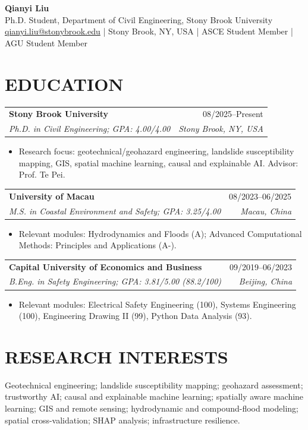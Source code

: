 \documentclass[10pt,letterpaper]{article}
\makeatletter
\newcommand{\cvsubheading}[4]{%
  \begin{tabularx}{\textwidth}{@{}X r@{}}
    \textbf{#1} & #3 \\
    \textit{#2} & \textit{#4} \\
  \end{tabularx}\vspace{-3pt}
}
\makeatother
\begin{document}
\fontsize{9.25}{10.25}\selectfont

\begin{center}
    {\Large \textbf{Qianyi Liu}} \\
    \vspace{1pt}
    Ph.D. Student, Department of Civil Engineering, Stony Brook University \\
    \vspace{1pt}
    \href{mailto:qianyi.liu@stonybrook.edu}{qianyi.liu@stonybrook.edu} \; | \; Stony Brook, NY, USA \; | \; ASCE Student Member \; | \; AGU Student Member
\end{center}
\vspace{-6pt}

\section*{EDUCATION}
\cvsubheading{Stony Brook University}{Ph.D. in Civil Engineering; GPA: 4.00/4.00}{08/2025--Present}{Stony Brook, NY, USA}
\begin{itemize}
    \item Research focus: geotechnical/geohazard engineering, landslide susceptibility mapping, GIS, spatial machine learning, causal and explainable AI. Advisor: Prof. Te Pei.
\end{itemize}

\cvsubheading{University of Macau}{M.S. in Coastal Environment and Safety; GPA: 3.25/4.00}{08/2023--06/2025}{Macau, China}
\begin{itemize}
    \item Relevant modules: Hydrodynamics and Floods (A); Advanced Computational Methods: Principles and Applications (A-).
\end{itemize}

\cvsubheading{Capital University of Economics and Business}{B.Eng. in Safety Engineering; GPA: 3.81/5.00 (88.2/100)}{09/2019--06/2023}{Beijing, China}
\begin{itemize}
    \item Relevant modules: Electrical Safety Engineering (100), Systems Engineering (100), Engineering Drawing II (99), Python Data Analysis (93).
\end{itemize}

\section*{RESEARCH INTERESTS}
Geotechnical engineering; landslide susceptibility mapping; geohazard assessment; trustworthy AI; causal and explainable machine learning; spatially aware machine learning; GIS and remote sensing; hydrodynamic and compound-flood modeling; spatial cross-validation; SHAP analysis; infrastructure resilience.
\end{document}
